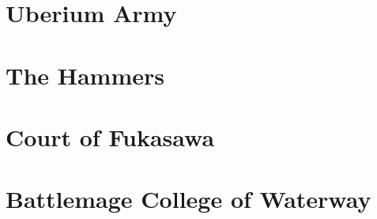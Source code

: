 



\frontmatter
\maketitle
\tableofcontents

\mainmatter%
\section{Uberium Army}
\vspace{4mm}

\clearpage\section{The Hammers}
\vspace{4mm}

\clearpage\section{Court of Fukasawa}
\vspace{4mm}

\clearpage\section{Battlemage College of Waterway}


